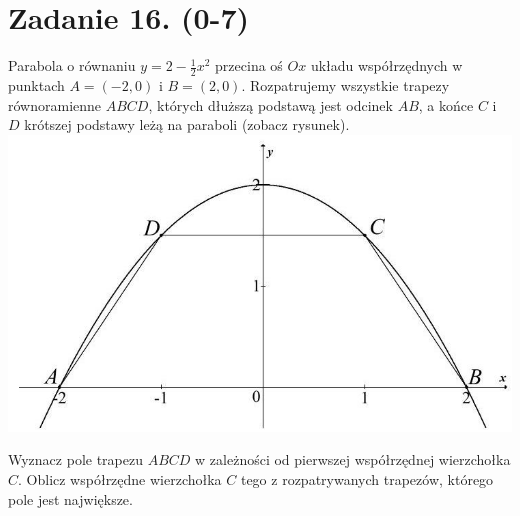 \documentclass[10pt]{article}
\begin{document}
\section*{Zadanie 16. (0-7)}
Parabola o równaniu \(y=2-\frac{1}{2} x^{2}\) przecina oś \(O x\) układu współrzędnych w punktach \(A=(-2,0)\) i \(B=(2,0)\). Rozpatrujemy wszystkie trapezy równoramienne \(A B C D\), których dłuższą podstawą jest odcinek \(A B\), a końce \(C\) i \(D\) krótszej podstawy leżą na paraboli (zobacz rysunek).\\
\includegraphics[max width=\textwidth, center]{2024_11_21_054c332d5c02f869c372g-20}

Wyznacz pole trapezu \(A B C D\) w zależności od pierwszej współrzędnej wierzchołka \(C\). Oblicz współrzędne wierzchołka \(C\) tego z rozpatrywanych trapezów, którego pole jest największe.
\end{document}
